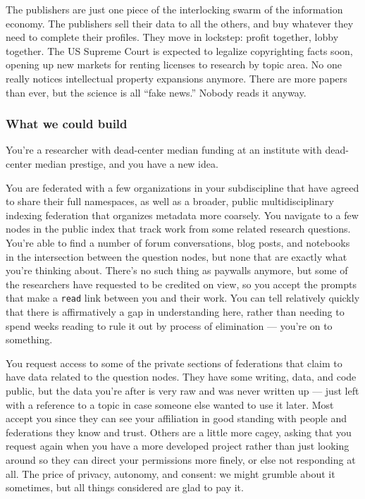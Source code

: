 \documentclass[10pt]{article}
\begin{document}
\begin{multicols}{2}
The publishers are just one piece of the interlocking swarm of the
information economy. The publishers sell their data to all the others,
and buy whatever they need to complete their profiles. They move in
lockstep: profit together, lobby together. The US Supreme Court is
expected to legalize copyrighting facts soon, opening up new markets for
renting licenses to research by topic area. No one really notices
intellectual property expansions anymore. There are more papers than
ever, but the science is all ``fake news.'' Nobody reads it anyway.

\hypertarget{what-we-could-build}{%
\subsubsection{What we could build}\label{what-we-could-build}}

You're a researcher with dead-center median funding at an institute with
dead-center median prestige, and you have a new idea.

You are federated with a few organizations in your subdiscipline that
have agreed to share their full namespaces, as well as a broader, public
multidisciplinary indexing federation that organizes metadata more
coarsely. You navigate to a few nodes in the public index that track
work from some related research questions. You're able to find a number
of forum conversations, blog posts, and notebooks in the intersection
between the question nodes, but none that are exactly what you're
thinking about. There's no such thing as paywalls anymore, but some of
the researchers have requested to be credited on view, so you accept the
prompts that make a \texttt{read} link between you and their work. You
can tell relatively quickly that there is affirmatively a gap in
understanding here, rather than needing to spend weeks reading to rule
it out by process of elimination --- you're on to something.

You request access to some of the private sections of federations that
claim to have data related to the question nodes. They have some
writing, data, and code public, but the data you're after is very raw
and was never written up --- just left with a reference to a topic in
case someone else wanted to use it later. Most accept you since they can
see your affiliation in good standing with people and federations they
know and trust. Others are a little more cagey, asking that you request
again when you have a more developed project rather than just looking
around so they can direct your permissions more finely, or else not
responding at all. The price of privacy, autonomy, and consent: we might
grumble about it sometimes, but all things considered are glad to pay
it.


\end{multicols}
\end{document}
